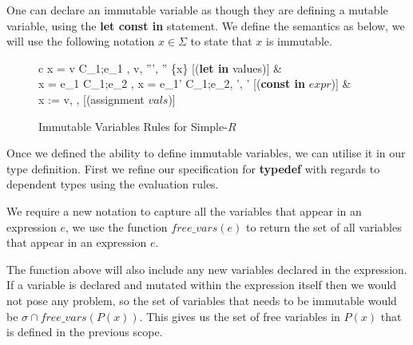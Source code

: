 \documentclass[a4paper,12pt]{report}
\begin{document}
One can declare an immutable variable as though they are defining a mutable 
variable, using the \textbf{let const in} statement. We define the semantics as 
below, we will use the following notation $x \in \Sigma$ to state that $x$ is 
immutable.

\begin{figure}[H]
  \begin{center}
    \begin{tabular}{c}
      {\langle {}x = v  C_1;e_1 , \sigma \rangle 
      \Longrightarrow \langle v, \sigma''', \tau'' \setminus \{x\} \rangle} [(\textbf{let in} values)] 
      & \\
      {\langle {}x = e_1  C_1;e_2 , \sigma \rangle 
      \Longrightarrow \langle {}x = e_1'  C_1;e_2, \sigma', \tau' \rangle} 
      [(\textbf{const in} $expr$)]
      & \\
      {\langle x := v, \sigma, \tau \rangle \longrightarrow \sigma[x \mapsto v]} [(assignment $vals$)] \text{ }
    \end{tabular}
  \end{center}
  \caption{Immutable Variables Rules for Simple-$R$}
\end{figure}

\par
Once we defined the ability to define immutable variables, we can utilise it in 
our type definition. First we refine our specification for \textbf{typedef} 
with regards to dependent types using the evaluation rules.

\par
We require a new notation to capture all the variables that appear in an 
expression $e$, we use the function $free\_vars(e)$ to return the set of all 
variables that appear in an expression $e$.

\par
The function above will also include any new variables declared in the expression. 
If a variable is declared and mutated within the expression itself then we would 
not pose any problem, so the set of variables that needs to be immutable would 
be $\sigma \cap free\_vars(P(x))$. This gives us the set of free variables in $P(x)$ 
that is defined in the previous scope. 
\end{document}
